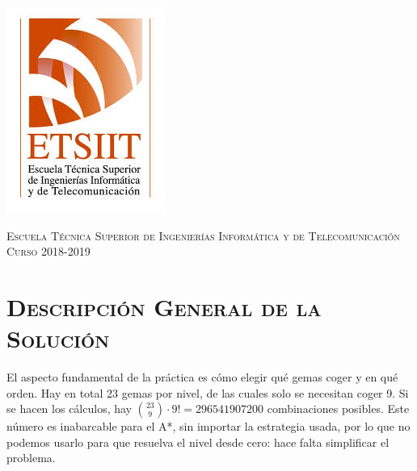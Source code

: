 \documentclass[11pt,a4paper]{article}
\begin{document}
\begin{titlepage}
\begin{minipage}{\textwidth}
\includegraphics[scale=0.3]{img/etsiit.jpeg}

\vspace{0.7cm}
\textsc{Escuela Técnica Superior de Ingenierías Informática y de Telecomunicación}\\
\vspace{1cm}
\textsc{Curso 2018-2019}
\end{minipage}
\end{titlepage}

\tableofcontents
\thispagestyle{empty}				%

\newpage

\setlength{\parskip}{1em}

\section{\textsc{Descripción General de la Solución}}

El aspecto fundamental de la práctica es cómo elegir qué gemas coger y en qué orden. Hay en total 23
gemas por nivel, de las cuales solo se necesitan coger 9. Si se hacen los cálculos, hay
${23\choose 9} \cdot 9! = 296541907200$ combinaciones posibles. Este número es inabarcable para el
A*, sin importar la estrategia usada, por lo que no podemos usarlo para que resuelva el nivel desde
cero: hace falta simplificar el problema.
\end{document}
